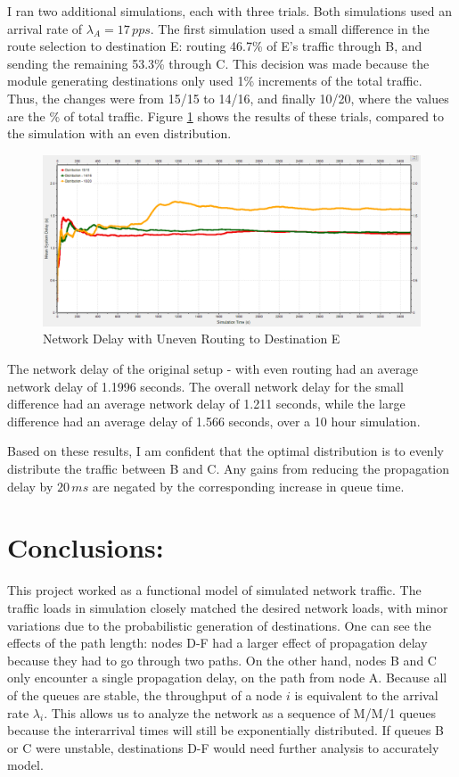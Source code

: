 \documentclass{article}
\begin{document}
I ran two additional simulations, each with three trials.
Both simulations used an arrival rate of $\lambda_A = 17 \, pps$.
The first simulation used a small difference in the route selection to destination E:  routing 46.7\% of E's traffic through B, and sending the remaining 53.3\% through C.
This decision was made because the module generating destinations only used 1\% increments of the total traffic. 
Thus, the changes were from 15/15 to 14/16, and finally 10/20, where the values are the \% of total traffic.
Figure \ref{fig:unevenDelay} shows the results of these trials, compared to the simulation with an even distribution.

\begin{figure}[h!]
\centering
\includegraphics[scale=0.5]{Images/UnevenDist.PNG}
\caption{Network Delay with Uneven Routing to Destination E}
\label{fig:unevenDelay}
\end{figure}

The network delay of the original setup - with even routing had an average network delay of 1.1996 seconds.
The overall network delay for the small difference had an average network delay of 1.211 seconds, while the large difference had an average delay of 1.566 seconds, over a 10 hour simulation.

Based on these results, I am confident that the optimal distribution is to evenly distribute the traffic between B and C.
Any gains from reducing the propagation delay by $20 \, ms$ are negated by the corresponding increase in queue time.


\section{Conclusions:}
\label{sec:Conclusions}
This project worked as a functional model of simulated network traffic.
The traffic loads in simulation closely matched the desired network loads, with minor variations due to the probabilistic generation of destinations.
One can see the effects of the path length:  nodes D-F had a larger effect of propagation delay because they had to go through two paths.
On the other hand, nodes B and C only encounter a single propagation delay, on the path from node A.
Because all of the queues are stable, the throughput of a node $i$ is equivalent to the arrival rate $\lambda_i$.
This allows us to analyze the network as a sequence of M/M/1 queues because the interarrival times will still be exponentially distributed.
If queues B or C were unstable, destinations D-F would need further analysis to accurately model.
\end{document}
